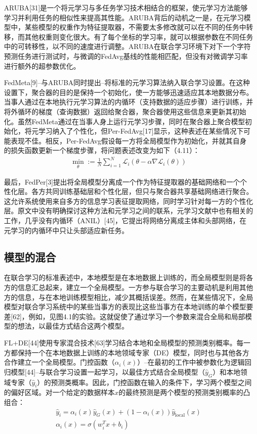ARUBA[31]是一个将元学习与多任务学习技术相结合的框架，使元学习方法能够学习并利用任务的相似性来提高其性能。ARUBA背后的动机之一是，在元学习模型中，某些模型的权重作为特征提取器，不需要太多修改就可以在不同的任务中转移，而其他权重则变化很大。有了每个坐标的学习率，就可以根据参数在不同任务中的可转移性，以不同的速度进行调整。ARUBA在联合学习环境下对下一个字符预测任务进行测试时，与微调的FedAvg基线的性能相匹配，但没有对微调学习率进行额外的超参数优化。

FedMeta[9]--与ARUBA同时提出--将标准的元学习算法纳入联合学习设置。在这种设置下，聚合器的目的是保持一个初始化，使一方能够迅速适应其本地数据分布。当事人通过在本地执行元学习算法的内循环（支持数据的适应步骤）进行训练，并将外循环的梯度（查询数据）返回给聚合器，聚合器使用这些信息来更新其初始化。虽然FedMeta通过在当事人身上运行元学习步骤，同时在聚合器上聚合模型初始化，将元学习纳入了个性化，但Per-FedAvg[17]显示，这种表述在某些情况下可能表现不佳。相反，Per-FedAvg假设每一方将全局模型作为初始化，并就其自身的损失函数更新一个梯度步骤，将问题表述改变为如下（4.11）：
\begin{align}\label{eq:4-11}
	\min_{\theta} := \frac{1}{N} \sum_{i=1}^{N} \mathcal{L}_{i}(\theta - \alpha \nabla \mathcal{L}_{i}(\theta))
\end{align}

最后，FedPer[3]提出将全局模型分离成一个作为特征提取器的基础网络和一个个性化层。各方共同训练基础层和个性化层，但只与聚合器共享基础网络进行聚合。这允许系统使用来自多方的信息学习表征提取网络，同时学习针对每一方的个性化层。原文中没有明确探讨这种方法和元学习之间的联系，元学习文献中也有相关的工作，几乎没有内循环（ANIL）[45]，它提出将网络分离成主体和头部网络，在元学习的内循环中只让头部适应新任务。

\subsection{模型的混合}
在联合学习的标准表述中，本地模型是在本地数据上训练的，而全局模型则是将各方的信息汇总起来，建立一个全局模型。一方参与联合学习的主要动机是利用其他方的信息，与在本地训练模型相比，减少其概括误差。然而，在某些情况下，全局模型对联合学习系统中的某些当事方的表现比这些当事方在本地训练的单个模型要差[62]，例如，见图4.1的实验。这就促使了通过学习一个参数来混合全局和局部模型的想法，以最佳方式结合这两个模型。

FL+DE[44]使用专家混合技术[63]学习结合本地和全局模型的预测类别概率。每一方都保持一个在本地数据上训练的本地领域专家（DE）模型，同时也与其他各方合作建立一个全局模型。门控函数（$\alpha_{i}(x)$）--在最初的工作中被参数化为逻辑回归模型[44]--与联合学习设置一起学习，以最佳方式结合全局模型（$\hat{y}_{G}$）和本地领域专家（$\hat{y}_{i}$）的预测类概率。因此，门控函数在输入的条件下，学习两个模型之间的偏好区域。对一个给定的数据样本$x$的最终预测是两个模型的预测类别概率的凸组合：
\begin{align}
	\hat{y}_{i} = \alpha_{i}(x)\hat{y}_{G}(x) + (1 - \alpha_{i}(x)) \hat{y}_{\text{local}}(x) \label{eq:4-12} \\
	\alpha_{i}(x) = \sigma(w_{i}^{T}x + b_{i}) \label{eq:4-13}
\end{align}

